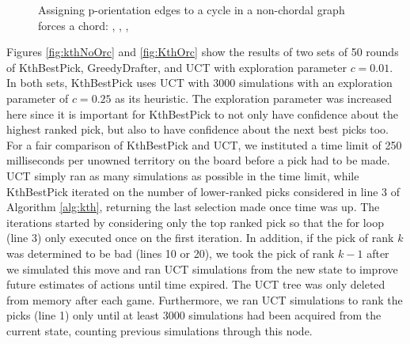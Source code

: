 \documentclass[letterpaper]{article}
\numberwithin{equation}{section}
\numberwithin{theorem}{section}
\numberwithin{lemma}{section}
\numberwithin{df}{section}
\begin{document}
\begin{figure}[ht]
{\label{fig:subfigAct3}
}\hspace{5pt}
\label{fig:subfigureExample}
\caption[]{Assigning p-orientation edges to a cycle in a non-chordal graph forces a chord: , , , }
\end{figure}


Figures \ref{fig:kthNoOrc} and \ref{fig:KthOrc} show the results of two sets of 50 rounds of KthBestPick, GreedyDrafter, and UCT with exploration parameter $c=0.01$.  In both sets, KthBestPick uses UCT with 3000 simulations with an exploration parameter of $c=0.25$ as its heuristic.  The exploration parameter was increased here since it is important for KthBestPick to not only have confidence about the highest ranked pick, but also to have confidence about the next best picks too.  For a fair comparison of KthBestPick and UCT, we instituted a time limit of 250 milliseconds per unowned territory on the board before a pick had to be made.  UCT simply ran as many simulations as possible in the time limit, while KthBestPick iterated on the number of lower-ranked picks considered in line 3 of Algorithm \ref{alg:kth}, returning the last selection made once time was up.  The iterations started by considering only the top ranked pick so that the for loop (line 3) only executed once on the first iteration.  In addition, if the pick of rank $k$ was determined to be bad (lines 10 or 20), we took the pick of rank $k-1$ after we simulated this move and ran UCT simulations from the new state to improve future estimates of actions until time expired.  The UCT tree was only deleted from memory after each game.  Furthermore, we ran UCT simulations to rank the picks (line 1) only until at least 3000 simulations had been acquired from the current state, counting previous simulations through this node.
\end{document}

